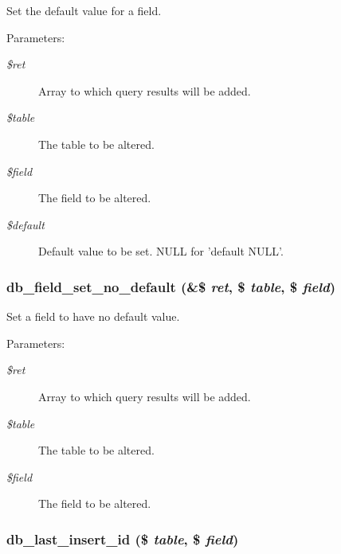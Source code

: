 Set the default value for a field.

\begin{Desc}
\item[Parameters:]
\begin{description}
\item[{\em \$ret}]Array to which query results will be added. \item[{\em \$table}]The table to be altered. \item[{\em \$field}]The field to be altered. \item[{\em \$default}]Default value to be set. NULL for 'default NULL'. \end{description}
\end{Desc}
\hypertarget{group__schemaapi_ga01758e1338d2b1ce59da26c08c6448a}{
\subsubsection[{db\_\-field\_\-set\_\-no\_\-default}]{\setlength{\rightskip}{0pt plus 5cm}db\_\-field\_\-set\_\-no\_\-default (\&\$ {\em ret}, \/  \$ {\em table}, \/  \$ {\em field})}}
\label{group__schemaapi_ga01758e1338d2b1ce59da26c08c6448a}


Set a field to have no default value.

\begin{Desc}
\item[Parameters:]
\begin{description}
\item[{\em \$ret}]Array to which query results will be added. \item[{\em \$table}]The table to be altered. \item[{\em \$field}]The field to be altered. \end{description}
\end{Desc}
\hypertarget{group__schemaapi_g1d29b142caeee2f0f2217be16857b9ae}{
\subsubsection[{db\_\-last\_\-insert\_\-id}]{\setlength{\rightskip}{0pt plus 5cm}db\_\-last\_\-insert\_\-id (\$ {\em table}, \/  \$ {\em field})}}
\label{group__schemaapi_g1d29b142caeee2f0f2217be16857b9ae}



